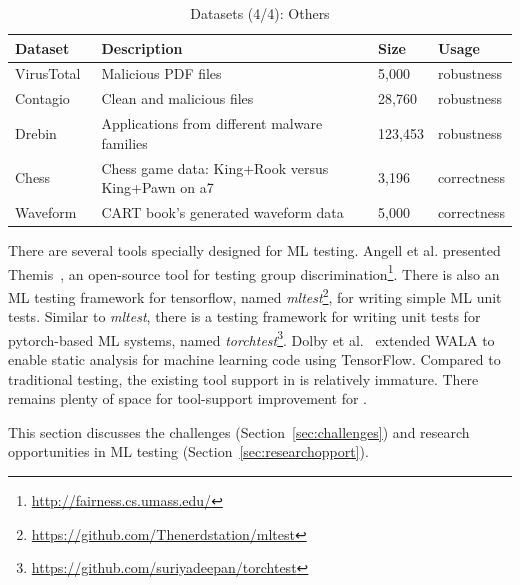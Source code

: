 \begin{table}[h!]\small
	\center
	\caption{\label{tab:dataset5}Datasets (4/4): Others}
	\begin{tabular}{p{3.9cm}|  p{7.5cm}| p{2cm}| p{2.9cm}}
		\toprule
		\textbf{Dataset}&\textbf{Description}&\textbf{Size}&\textbf{Usage}\\ \midrule 
		VirusTotal~&Malicious PDF files&5,000&robustness \\ \midrule
		Contagio~&Clean and malicious files&28,760&robustness  \\  \midrule
		Drebin~&Applications from different malware families&123,453&robustness\\ \midrule
		Chess~ &Chess game data: King+Rook versus King+Pawn on a7&3,196&correctness\\ \midrule
		Waveform~&CART book's generated waveform data&5,000&correctness\\
		\bottomrule		
	\end{tabular}
\end{table}

\label{sec:tooltechnique}
There are several tools specially designed for ML testing.
Angell et al. presented Themis~, an open-source tool for testing group discrimination\footnote{\url{http://fairness.cs.umass.edu/}}.
There is also an ML testing framework for tensorflow, named \emph{mltest}\footnote{\url{https://github.com/Thenerdstation/mltest}},
for writing simple ML unit tests.
Similar to \emph{mltest}, there is a testing framework for writing unit tests for pytorch-based ML systems, named \emph{torchtest}\footnote{\url{https://github.com/suriyadeepan/torchtest}}.
Dolby et al.~ extended WALA to enable static analysis for machine learning code using TensorFlow.
Compared to traditional testing, the existing tool support in \mlt{} is relatively immature.
There remains plenty of space for tool-support improvement for \mlt{}.

\label{sec:researchdirection}
This section discusses the challenges (Section~\ref{sec:challenges}) and research opportunities in ML testing (Section~\ref{sec:researchopport}).

